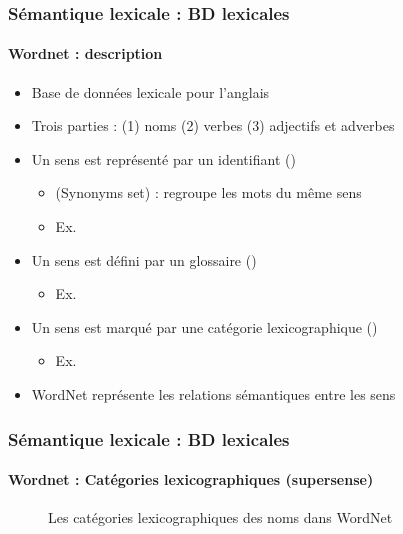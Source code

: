 \documentclass[xcolor=table]{beamer}
\begin{document}
\begin{frame}
\frametitle{Sémantique lexicale : BD lexicales}
\framesubtitle{Wordnet : description}
	
\begin{itemize}
	\item Base de données lexicale pour l'anglais \cite{1995-miller}
	\item Trois parties : (1) noms (2) verbes (3) adjectifs et adverbes
	\item Un sens est représenté par un identifiant ()
	\begin{itemize}
		\item {} (Synonyms set) : regroupe les mots du même sens 
		\item Ex. 
	\end{itemize}
	\item Un sens est défini par un glossaire ()
	\begin{itemize}
		\item Ex. 
	\end{itemize}
	\item Un sens est marqué par une catégorie lexicographique ()
	\begin{itemize}
		\item Ex. 
	\end{itemize}
	\item WordNet représente les relations sémantiques entre les sens
\end{itemize}
	
\end{frame}

\begin{frame}
\frametitle{Sémantique lexicale : BD lexicales}
\framesubtitle{Wordnet : Catégories lexicographiques (supersense)}
	
\begin{figure}
	\caption{Les catégories lexicographiques des noms dans WordNet \cite{2019-jurafsky-martin}}
\end{figure}
	
\end{frame}
\end{document}
